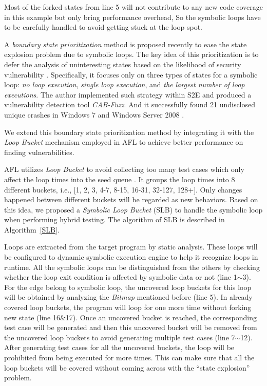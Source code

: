 Most of the forked states from line 5 will not contribute to any new code coverage in this example but only bring performance overhead, So the symbolic loops have to be carefully handled to avoid getting stuck at the loop spot. 

A \textit{boundary state prioritization} method is proposed recently to ease the state explosion problem due to symbolic loops.
 The key idea of this prioritization is to defer the analysis of uninteresting states based on the likelihood of security vulnerability \cite{cab-fuzz}. 
 Specifically, it focuses only on three types of states for a symbolic loop: \textit{no loop execution}, \textit{single loop execution}, and \textit{the largest number of loop executions}.
 The author implemented such strategy within S2E \cite{chipounov2011s2e} and produced a vulnerability detection tool \textit{CAB-Fuzz}.
 And it successfully found 21 undisclosed unique crashes in Windows 7 and Windows Server 2008 \cite{cab-fuzz}.
 
We extend this boundary state prioritization method by integrating it with the \emph{Loop Bucket} mechanism employed in AFL \cite{online:afl} to achieve better performance on finding vulnerabilities.
 
AFL utilizes \emph{Loop Bucket} to avoid collecting too many test cases which only affect the loop times into the seed queue \cite{online:afl}. It groups the loop times into 8 different buckets, i.e., [1, 2, 3, 4-7, 8-15, 16-31, 32-127, 128+]. Only changes happened between different buckets will be regarded as new behaviors. Based on this idea, we proposed a \textit{Symbolic Loop Bucket} (SLB) to handle the symbolic loop when performing hybrid testing. The algorithm of SLB is described in Algorithm~\ref{SLB}.

Loops are extracted from the target program by static analysis. These loops will be configured to dynamic symbolic execution engine to help it recognize loops in runtime. All the symbolic loops can be distinguished from the others by checking whether the loop exit condition is affected by symbolic data or not (line 1$\sim$3). For the edge belong to symbolic loop, the uncovered loop buckets for this loop will be obtained by analyzing the \textit{Bitmap} mentioned before (line 5). 
In already covered loop buckets, the program will loop for one more time without forking new state (line 16\&17). Once an uncovered bucket is reached, the corresponding test case will be generated and then this uncovered bucket will be removed from the uncovered loop buckets to avoid generating multiple test cases (line 7$\sim$12). After generating test cases for all the uncovered buckets, the loop will be prohibited from being executed for more times. This can make sure that all the loop buckets will be covered without coming across with the ``state explosion'' problem.


